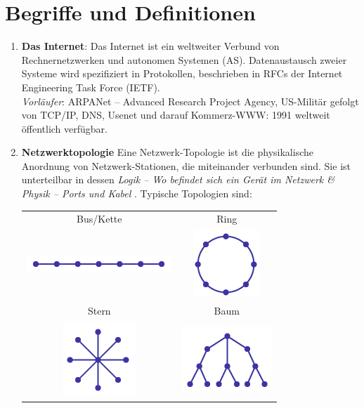 \documentclass{article}
\begin{document}
\section{Begriffe und Definitionen}
    \begin{enumerate}[$\bullet$]
        \item \textbf{Das Internet}:
        Das Internet ist ein weltweiter Verbund von Rechnernetzwerken und autonomen Systemen (AS). Datenaustausch zweier Systeme wird spezifiziert in Protokollen, beschrieben in RFCs der Internet Engineering Task Force (IETF).\\
        \textit{Vorläufer}: ARPANet -- Advanced Research Project Agency, US-Militär gefolgt von TCP/IP, DNS, Usenet und darauf Kommerz-WWW: 1991 weltweit öffentlich verfügbar.
        \item \textbf{Netzwerktopologie}
        Eine Netzwerk-Topologie ist die physikalische Anordnung von Netzwerk-Stationen, die miteinander verbunden sind. Sie ist unterteilbar in dessen \textit{Logik -- Wo befindet sich ein Gerät im Netzwerk \& Physik -- Ports und Kabel }. 
        Typische Topologien sind:
        \begin{center}
            \begin{tabular}{c|c}
            Bus/Kette & Ring  \\
            \includegraphics[]{Topologie_Chain.png}     &  \includegraphics[]{Topologie_Ring.png} \\\hline
            Stern     &  Baum \\
            \includegraphics[]{Topologie_Star.png} & \includegraphics[]{Topologie_Tree.png}       \\\hline

\end{tabular}
\end{center}
\end{enumerate}
\end{document}
